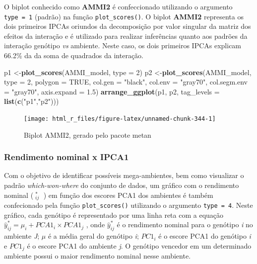 \documentclass[
]{book}
\makeatletter
\newenvironment{Shaded}{\begin{snugshade}}{\end{snugshade}}
\newcommand{\DataTypeTok}[1]{\textcolor[rgb]{0.13,0.29,0.53}{#1}}
\newcommand{\DecValTok}[1]{\textcolor[rgb]{0.00,0.00,0.81}{#1}}
\newcommand{\FloatTok}[1]{\textcolor[rgb]{0.00,0.00,0.81}{#1}}
\newcommand{\KeywordTok}[1]{\textcolor[rgb]{0.13,0.29,0.53}{\textbf{#1}}}
\newcommand{\NormalTok}[1]{#1}
\newcommand{\OtherTok}[1]{\textcolor[rgb]{0.56,0.35,0.01}{#1}}
\newcommand{\StringTok}[1]{\textcolor[rgb]{0.31,0.60,0.02}{#1}}
\numberwithin{equation}{section}
\newcommand{\indf}[1]{\index[function]{#1@\texttt{#1()}|ST}}
\makeatother
\begin{document}
O biplot conhecido como \textbf{AMMI2} é confeccionado utilizando o argumento \texttt{type\ =\ 1} (padrão) na função \texttt{plot\_scores()}. O biplot \textbf{AMMI2} representa os dois primeiros IPCAs oriundos da decomposição por valor singular da matriz dos efeitos da interação e é utilizado para realizar inferências quanto aos padrões da interação genótipo \emph{vs} ambiente. Neste caso, os dois primeiros IPCAs explicam 66.2\% da da soma de quadrados da interação.

\begin{Shaded}
\begin{Highlighting}[]

\NormalTok{p1 \textless{}{-}}\KeywordTok{plot\_scores}\NormalTok{(AMMI\_model, }\DataTypeTok{type =} \DecValTok{2}\NormalTok{)}
\NormalTok{p2 \textless{}{-}}\KeywordTok{plot\_scores}\NormalTok{(AMMI\_model,}
                 \DataTypeTok{type =} \DecValTok{2}\NormalTok{,}
                 \DataTypeTok{polygon =} \OtherTok{TRUE}\NormalTok{,}
                 \DataTypeTok{col.gen =} \StringTok{"black"}\NormalTok{,}
                 \DataTypeTok{col.env =} \StringTok{"gray70"}\NormalTok{,}
                 \DataTypeTok{col.segm.env =} \StringTok{"gray70"}\NormalTok{,}
                 \DataTypeTok{axis.expand =} \FloatTok{1.5}\NormalTok{)}
\KeywordTok{arrange\_ggplot}\NormalTok{(p1, p2, }\DataTypeTok{tag\_levels =} \KeywordTok{list}\NormalTok{(}\KeywordTok{c}\NormalTok{(}\StringTok{"p1"}\NormalTok{,}\StringTok{"p2"}\NormalTok{)))}
\end{Highlighting}
\end{Shaded}

\begin{figure}

{\centering \texttt{[image: html\_r\_files/figure-latex/unnamed-chunk-344-1]} 

}

\caption{Biplot AMMI2, gerado pelo pacote metan}\label{fig:unnamed-chunk-344}
\end{figure}

\hypertarget{rendimento-nominal-x-ipca1}{%
\subsubsection{Rendimento nominal x IPCA1}\label{rendimento-nominal-x-ipca1}}

Com o objetivo de identificar possíveis mega-ambientes, bem como visualizar o padrão \emph{which-won-where} do conjunto de dados, um gráfico com o rendimento nominal (\(\mathop {\hat y} \nolimits_ {ij}^*\) ) em função dos escores PCA1 dos ambientes é também confecionado pela função \texttt{plot\_scores()} utilizando o argumento \texttt{type\ =\ 4}. Neste gráfico, cada genótipo é representado por uma linha reta com a equação \(\hat y_{ij}^* = \mu_i + PCA1_i \times PCA1_j\) , onde \(\hat y_{ij}^*\) é o rendimento nominal para o genótipo \emph{i} no ambiente \emph{J}; \(\mu\) é a média geral do genótipo \emph{i}; \(PC{1_i}\) é o escore PCA1 do genótipo \emph{i} e \(PC{1_j}\) é o escore PCA1 do ambiente \emph{j}. O genótipo vencedor em um determinado ambiente possui o maior rendimento nominal nesse ambiente.\indf{plot\_scores}
\end{document}
